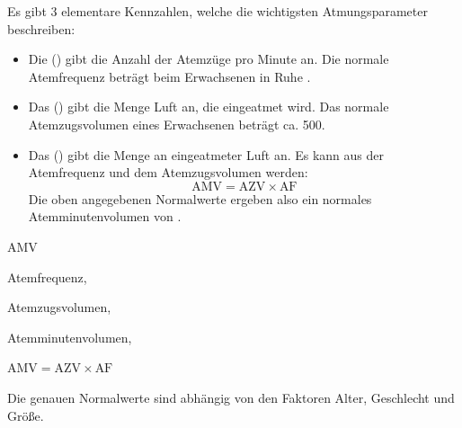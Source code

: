 
{%
%
Es gibt 3 elementare Kennzahlen, welche die wichtigsten Atmungsparameter
beschreiben:

\begin{itemize}
  \item Die  () gibt die Anzahl der
  Atemzüge pro Minute an. Die normale Atemfrequenz  beträgt beim Erwachsenen
  in Ruhe \PerMin*.
  \item Das  () gibt die Menge
  Luft an, die  eingeatmet wird. Das normale
  Atemzugsvolumen  eines Erwachsenen beträgt ca.
  500\Ml*.
  \item Das  () gibt die Menge
  an  eingeatmeter Luft an. 
  Es kann aus der
  Atemfrequenz und dem Atemzugsvolumen  werden:
  {\FontSansNarrowFamily
  \begin{equation}
    \mbox{AMV} = \mbox{AZV} \times \mbox{AF}
  \end{equation}
  }
  Die oben angegebenen Normalwerte ergeben also ein normales
  Atemminutenvolumen von  \LPerMin*. 
\end{itemize}

}{
\begin{labeling}[:]{AMV}
    \item[AF] Atemfrequenz,
    \item[AZV] Atemzugsvolumen,
    \EE{500\Ml*}
    \item[AMV] Atemminutenvolumen,
\end{labeling}

\begin{center}
{\FontSansNarrowFamily
$\mbox{AMV} = \mbox{AZV} \times \mbox{AF}$
}
\end{center}
}{}{}{}
Die genauen Normalwerte sind abhängig von den Faktoren
Alter, Geschlecht und Größe.
\cite{KlinkePhysio3,SchmidtPhysio28,DRAn3,StriebelAn7}

